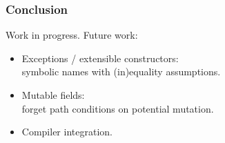 \documentclass[dvipsnames,aspectratio=169]{beamer}
\begin{document}
\begin{frame}[fragile]
\frametitle{Conclusion}


\vfill

Work in progress. Future work:
\begin{itemize}
\item Exceptions / extensible constructors:\\symbolic names with (in)equality assumptions.

\item Mutable fields:\\forget path conditions on potential mutation.

\item Compiler integration.
\end{itemize}
\end{frame}
\end{document}

